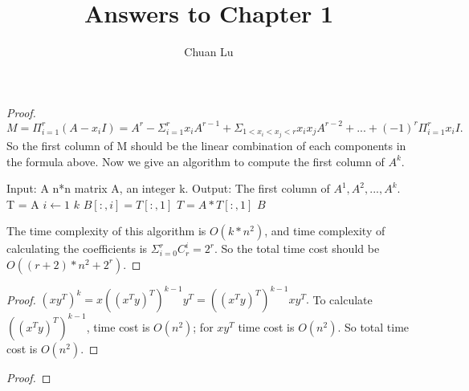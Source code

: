 \documentclass[12pt]{article}
\newenvironment{problem}[2][Problem]{\begin{trivlist}
\item[\hskip \labelsep {\bfseries #1}\hskip \labelsep {\bfseries #2.}]}{\end{trivlist}}
\begin{document}
 
\title{Answers to Chapter 1}
\author{Chuan Lu}
\maketitle
 
\begin{problem}{Page 13, P1.1.1}
\end{problem}
\begin{proof}
$M = \Pi_{i=1}^{r}(A-x_{i}I)=A^r-\Sigma_{i=1}^{r}x_{i}A^{r-1}+\Sigma_{1<x_i<x_j<r}x_ix_jA^{r-2}+...+(-1)^r\Pi_{i=1}^{r}x_iI.$\\
So the first column of M should be the linear combination of each components in the formula above. Now we give an algorithm to compute the first column of $A^k$.
\begin{codebox}
\zi Input: A n*n matrix A, an integer k.
\zi Output: The first column of $A^1, A^2, ..., A^k$.
\li T = A
\li \For $i \gets 1$ \To $k$
\li 	\Do
			$B[:, i] = T[:, 1]$
\li			$T = A*T[:, 1]$
		\End
\li \Return $B$
\end{codebox}
The time complexity of this algorithm is $O(k*n^2)$, and time complexity of calculating the coefficients is $\Sigma_{i=0}^{r}C_{r}^{i} = 2^r$. So the total time cost should be $O((r+2)*n^2+2^r)$.
\end{proof}

\begin{problem}{Page 13, P1.1.3}
\end{problem}
\begin{proof}
$(xy^T)^k = x((x^Ty)^T)^{k-1}y^T = ((x^Ty)^T)^{k-1}xy^T.$
To calculate $((x^Ty)^T)^{k-1}$, time cost is $O(n^2)$; for $xy^T$ time cost is $O(n^2)$. So total time cost is $O(n^2)$.
\end{proof}

\begin{problem}{Page 13, P1.1.4}
\end{problem}
\begin{proof}

\end{proof}
\end{document}
